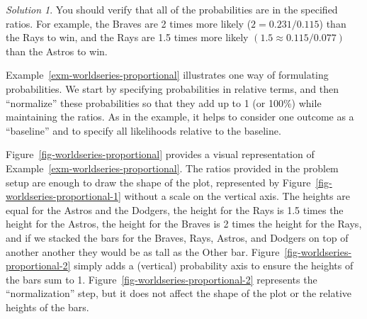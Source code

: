\documentclass[
  letterpaper,
  DIV=11,
  numbers=noendperiod]{scrreprt}
\theoremstyle{plain}
\theoremstyle{definition}
\theoremstyle{definition}
\theoremstyle{definition}
\theoremstyle{remark}
\newtheorem{refsolution}{Solution}[chapter]
\begin{document}
\begin{tcolorbox}
\begin{refsolution}
You should verify that all of the probabilities are in the specified
ratios. For example, the Braves are 2 times more likely
(\(2 = 0.231 / 0.115\)) than the Rays to win, and the Rays are 1.5 times
more likely \((1.5 \approx 0.115 / 0.077)\) than the Astros to win.

\label{sol-worldseries-proportional}

\end{refsolution}

\end{tcolorbox}


Example~\ref{exm-worldseries-proportional} illustrates one way of
formulating probabilities. We start by specifying probabilities in
relative terms, and then ``normalize'' these probabilities so that they
add up to 1 (or 100\%) while maintaining the ratios. As in the example,
it helps to consider one outcome as a ``baseline'' and to specify all
likelihoods relative to the baseline.

Figure~\ref{fig-worldseries-proportional} provides a visual
representation of Example~\ref{exm-worldseries-proportional}. The ratios
provided in the problem setup are enough to draw the shape of the plot,
represented by Figure~\ref{fig-worldseries-proportional-1} without a
scale on the vertical axis. The heights are equal for the Astros and the
Dodgers, the height for the Rays is 1.5 times the height for the Astros,
the height for the Braves is 2 times the height for the Rays, and if we
stacked the bars for the Braves, Rays, Astros, and Dodgers on top of
another another they would be as tall as the Other bar.
Figure~\ref{fig-worldseries-proportional-2} simply adds a (vertical)
probability axis to ensure the heights of the bars sum to 1.
Figure~\ref{fig-worldseries-proportional-2} represents the
``normalization'' step, but it does not affect the shape of the plot or
the relative heights of the bars.
\end{document}
